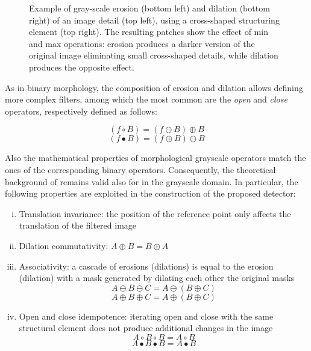 \documentclass[review]{elsarticle}
\begin{document}
\begin{figure}[h!]
\begin{tabular}{cc}
	\end{tabular}
	\caption{Example of gray-scale erosion (bottom left) and dilation (bottom right) of an image detail (top left), using a cross-shaped structuring element (top right). The resulting patches show the effect of min and max operations: erosion produces a darker version of the original image eliminating small cross-shaped details, while dilation produces the opposite effect.}
\end{figure}

As in binary morphology, the composition of erosion and dilation allows defining more complex filters, among which the most common are the \textit{open} and \textit{close} operators, respectively defined as follows:

\begin{equation}
(f \circ B) = (f \ominus B) \oplus B
\end{equation}
\begin{equation}
(f \bullet B) = (f \oplus B) \ominus B
\end{equation}

Also the mathematical properties of morphological grayscale operators match the ones of the corresponding binary operators. Consequently, the theoretical background of \cite{de2017detecting} remains valid also for in the grayscale domain. In particular, the following properties are exploited in the construction of the proposed detector:

\begin{enumerate}[(i)]
	\item Translation invariance: the position of the reference point only affects the translation of the filtered image
	\item Dilation commutativity: $A\oplus B = B \oplus A$
	\item Associativity: a cascade of erosions (dilations) is equal to the erosion (dilation) with a mask generated by dilating each other the original masks
	\begin{equation}
	A \ominus B \ominus C = A \ominus (B \oplus C)
	\end{equation}
	\begin{equation}
	A \oplus B \oplus C = A \oplus (B \oplus C)
	\end{equation} 
	\item Open and close idempotence: iterating open and close with the same structural element does not produce additional changes in the image
	\begin{equation}
	A \circ B \circ B = A \circ B
	\end{equation}
	\begin{equation}
	A \bullet B \bullet B = A \bullet B
	\end{equation} 
\end{enumerate}
\end{document}
